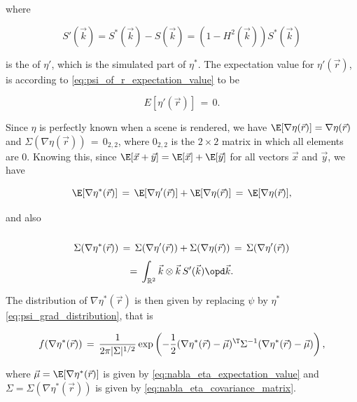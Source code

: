 where

\begin{equation}
S'(\vec{k}) = S^*(\vec{k}) - S(\vec{k}) = (1-H^2(\vec{k}))S^*(\vec{k})
\end{equation}

is the  of $\eta'$, which is the simulated part of $\eta^*$. The expectation value for $\eta'(\vec{r})$, is according to \eqref{eq:psi_of_r_expectation_value} \assumed to be

\begin{equation}
E[\eta'(\vec{r})] \,=\, 0.
\end{equation}

Since $\eta$ is perfectly known when a scene is rendered, we have $\E[\nabla\eta(\vec{r})] = \nabla\eta(\vec{r})$ and $\Sigma(\nabla\eta(\vec{r})) \,=\, 0_{2,2}$, where $0_{2,2}$ is the $2\times 2$ matrix in which all elements are 0. Knowing this, since $\E[\vec{x}+\vec{y}] = \E[\vec{x}]+\E[\vec{y}]$ for all vectors $\vec{x}$ and $\vec{y}$, we have

\begin{equation} \label{eq:nabla_eta_expectation_value}
\E[\nabla\eta^*(\vec{r})] \,=\, \E[\nabla\eta'(\vec{r})] + \E[\nabla\eta(\vec{r})] \,=\, \E[\nabla\eta(\vec{r})],
\end{equation}

and also

\begin{equation} \label{eq:nabla_eta_covariance_matrix}
\renewcommand*{\arraystretch}{2}
\begin{array}{c}
\displaystyle \Sigma(\nabla\eta^*(\vec{r})) \,=\, \Sigma(\nabla\eta'(\vec{r})) + \Sigma(\nabla\eta(\vec{r})) \,=\, \Sigma(\nabla\eta'(\vec{r})) \\
\displaystyle =\, \int_{\mathbb{R}^2}\vec{k}\otimes\vec{k}\,S'(\vec{k})\opd\vec{k}.
\end{array}
\end{equation}

The distribution of $\nabla\eta^*(\vec{r})$ is then given by replacing $\psi$ by $\eta^*$ \eqref{eq:psi_grad_distribution}, that is

\begin{equation} \label{eq:eta_grad_distribution_r_uniformly_distributed}
f(\nabla\eta^*(\vec{r})) \,=\, \frac{1}{2\pi|\Sigma|^{1/2}}\exp\left(-\frac{1}{2}(\nabla\eta^*(\vec{r})-\vec{\mu})^{\T}\Sigma^{-1}(\nabla\eta^*(\vec{r})-\vec{\mu})\right),
\end{equation}

where $\vec{\mu} = \E[\nabla\eta^*(\vec{r})]$ is given by \eqref{eq:nabla_eta_expectation_value} and $\Sigma = \Sigma(\nabla\eta^*(\vec{r}))$ is given by \eqref{eq:nabla_eta_covariance_matrix}.

